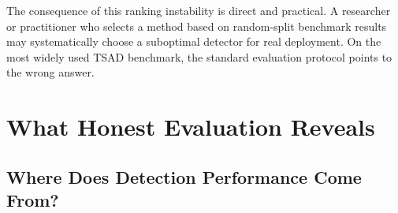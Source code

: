 \documentclass[preprint,12pt]{elsarticle}
\begin{document}
\begin{table}[htbp]
\centering
\small\setlength{\tabcolsep}{3pt}
\caption{Method rankings under random vs.\ temporal split. With $n=5$ methods, the minimum $|\rho|$ for statistical significance at $\alpha=0.05$ (two-tailed) is 1.0; all reported $\rho$ values are descriptive effect sizes. The 9-method expansion confirms that random-split rankings can be uninformative about temporal-split performance even with adequate statistical power.}
\label{tab:ranking}
\end{table}

The consequence of this ranking instability is direct and practical. A researcher or practitioner who selects a method based on random-split benchmark results may systematically choose a suboptimal detector for real deployment. On the most widely used TSAD benchmark, the standard evaluation protocol points to the wrong answer.

\section{What Honest Evaluation Reveals}
\label{sec:consequences}

\subsection{Where Does Detection Performance Come From?}
\end{document}
